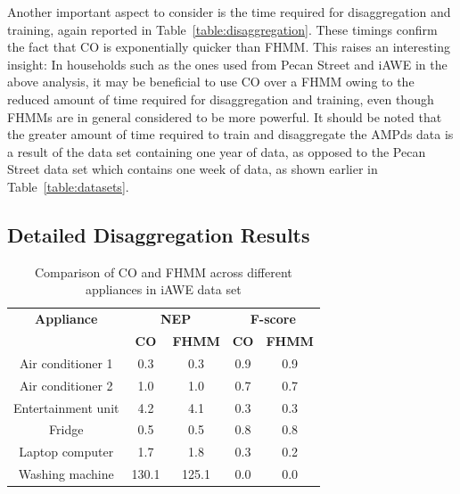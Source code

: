 \documentclass{sig-alternate}
\newcommand{\tabref}[1]{Table~\ref{#1}}
\begin{document}
Another important aspect to consider is the time required for disaggregation and training, again reported in \tabref{table:disaggregation}. These timings confirm the fact that CO is exponentially quicker than FHMM. This raises an interesting insight: In households such as the ones used from Pecan Street and iAWE in the above analysis, it may be beneficial to use CO over a FHMM owing to the reduced amount of time required for disaggregation and training, even though FHMMs are in general considered to be more powerful. It should be noted that the greater amount of time required to train and disaggregate the AMPds data is a result of the data set containing one year of data, as opposed to the Pecan Street data set which contains one week of data, as shown earlier in \tabref{table:datasets}.

\subsection{Detailed Disaggregation Results}


\begin{table}
    \begin{tabular}{ccccc}
    \hline \textbf{Appliance} & \multicolumn{2}{c}{\textbf{NEP}} & \multicolumn{2}{c}{\textbf{F-score}}\\
    ~                  & \textbf{CO}    & \textbf{FHMM}  & \textbf{CO}      & \textbf{FHMM} \\ \hline
    Air conditioner 1  & 0.3   & 0.3   & 0.9     & 0.9  \\
    Air conditioner 2  & 1.0   & 1.0   & 0.7     & 0.7  \\
    Entertainment unit & 4.2   & 4.1   & 0.3     & 0.3  \\
    Fridge             & 0.5   & 0.5   & 0.8     & 0.8  \\
    Laptop computer    & 1.7   & 1.8   & 0.3     & 0.2  \\
    Washing machine    & 130.1 & 125.1 & 0.0     & 0.0  \\
    \hline \end{tabular}
    \caption{Comparison of CO and FHMM across different appliances in iAWE data set}
\label{table:disaggregation_iawe}
\end{table}
\end{document}
